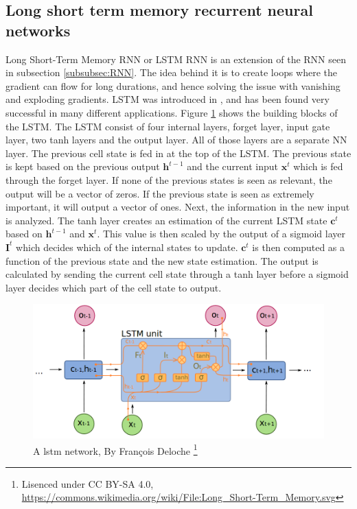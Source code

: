     \subsection{Long short term memory recurrent neural networks}
        Long Short-Term Memory RNN or LSTM RNN is an extension of the RNN seen in subsection \ref{subsubsec:RNN}. The idea behind it is to create loops where the gradient can flow for long durations, and hence solving the issue with vanishing and exploding gradients. LSTM was introduced in \cite{Hochreiter1997}, and has been found very successful in many different applications. Figure  \ref{fig:lstm} shows the building blocks of the LSTM. The LSTM consist of four internal layers, forget layer, input gate layer, two tanh layers and the output layer. All of those layers are a separate NN layer. The previous cell state is fed in at the top of the LSTM. The previous state is kept based on the previous output $\bm h^{t-1}$ and the current input $\bm x^t$ which is fed through the forget layer. If none of the previous states is seen as relevant, the output will be a vector of zeros. If the previous state is seen as extremely important, it will output a vector of ones. Next, the information in the new input is analyzed. The tanh layer creates an estimation of the current LSTM state $\bm c^t$ based on $\bm h^{t-1}$ and $\bm x^t$. This value is then scaled by the output of a sigmoid layer $\bm I^t$ which decides which of the internal states to update. $\bm c^t$ is then computed as a function of the previous state and the new state estimation. The output is calculated by sending the current cell state through a tanh layer before a sigmoid layer decides which part of the cell state to output.  
        
        \begin{figure}
            \begin{minipage}[b]{0.99\linewidth}
            \centering
            \includegraphics[width = \textwidth]{report/figures/techniques/lstm.png}
            \caption{A lstm network, By François Deloche \footnote{Lisenced under CC BY-SA 4.0, \url{https://commons.wikimedia.org/wiki/File:Long_Short-Term_Memory.svg}}} 
            \label{fig:lstm}
            \end{minipage}
        \end{figure}
        
